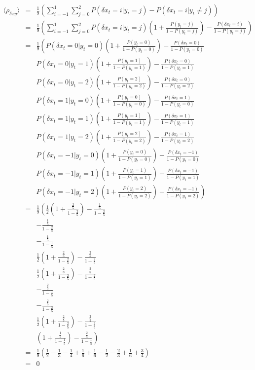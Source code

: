 \documentclass[a4paper,11pt]{article}
\begin{document}
\begin{eqnarray}
\langle \rho_{\delta xy}\rangle &=& \frac{1}{9}\left(\sum_{i=-1}^1 \sum_{j=0}^2 P(\delta x_t = i | y_t = j) - P(\delta x_t = i | y_t \neq j)\right)\\
&=& \frac{1}{9}\left(\sum_{i=-1}^1 \sum_{j=0}^2 P(\delta x_t = i | y_t = j)\left(1+\frac{P(y_t = j)}{1-P(y_t = j)}\right)-\frac{P(\delta x_t = i)}{1-P(y_t = j)}\right)\\
&=& \frac{1}{9}\left(P(\delta x_t = 0 | y_t = 0)\left(1+\frac{P(y_t = 0)}{1-P(y_t = 0)}\right)-\frac{P(\delta x_t = 0)}{1-P(y_t = 0)}\right.\\
& &P(\delta x_t = 0 | y_t = 1)\left(1+\frac{P(y_t = 1)}{1-P(y_t = 1)}\right)-\frac{P(\delta x_t = 0)}{1-P(y_t = 1)}\\
& &P(\delta x_t = 0 | y_t = 2)\left(1+\frac{P(y_t = 2)}{1-P(y_t = 2)}\right)-\frac{P(\delta x_t = 0)}{1-P(y_t = 2)}\\
& &P(\delta x_t = 1 | y_t = 0)\left(1+\frac{P(y_t = 0)}{1-P(y_t = 0)}\right)-\frac{P(\delta x_t = 1)}{1-P(y_t = 0)}\\
& &P(\delta x_t = 1 | y_t = 1)\left(1+\frac{P(y_t = 1)}{1-P(y_t = 1)}\right)-\frac{P(\delta x_t = 1)}{1-P(y_t = 1)}\\
& &P(\delta x_t = 1 | y_t = 2)\left(1+\frac{P(y_t = 2)}{1-P(y_t = 2)}\right)-\frac{P(\delta x_t = 1)}{1-P(y_t = 2)}\\
& &P(\delta x_t = -1 | y_t = 0)\left(1+\frac{P(y_t = 0)}{1-P(y_t = 0)}\right)-\frac{P(\delta x_t = -1)}{1-P(y_t = 0)}\\
& &P(\delta x_t = -1 | y_t = 1)\left(1+\frac{P(y_t = 1)}{1-P(y_t = 1)}\right)-\frac{P(\delta x_t = -1)}{1-P(y_t = 1)}\\
& &\left. P(\delta x_t = -1 | y_t = 2)\left(1+\frac{P(y_t = 2)}{1-P(y_t = 2)}\right)-\frac{P(\delta x_t = -1)}{1-P(y_t = 2)}\right)\\
&=& \frac{1}{9}\left(\frac{1}{2}\left(1+\frac{\frac{2}{5}}{1-\frac{2}{5}}\right)-\frac{\frac{1}{5}}{1-\frac{2}{5}}\right.\\
& &-\frac{\frac{1}{5}}{1-\frac{2}{5}}\\
& &-\frac{\frac{1}{5}}{1-\frac{1}{5}}\\
& &\frac{1}{2}\left(1+\frac{\frac{2}{5}}{1-\frac{2}{5}}\right)-\frac{\frac{2}{5}}{1-\frac{2}{5}}\\
& &\frac{1}{2}\left(1+\frac{\frac{2}{5}}{1-\frac{2}{5}}\right)-\frac{\frac{2}{5}}{1-\frac{2}{5}}\\
& &-\frac{\frac{2}{5}}{1-\frac{1}{5}}\\
& &-\frac{\frac{2}{5}}{1-\frac{2}{5}}\\
& &\frac{1}{2}\left(1+\frac{\frac{2}{5}}{1-\frac{2}{5}}\right)-\frac{\frac{2}{5}}{1-\frac{2}{5}}\\
& &\left. \left(1+\frac{\frac{1}{5}}{1-\frac{1}{5}}\right)-\frac{\frac{2}{5}}{1-\frac{1}{5}}\right)\\
&=& \frac{1}{9}\left(\frac{1}{2}-\frac{1}{3}-\frac{1}{4}+\frac{1}{6}+\frac{1}{6}-\frac{1}{2}-\frac{2}{3}+\frac{1}{6}+\frac{3}{4}\right)\\
&=& 0
\end{eqnarray}
\end{document}
